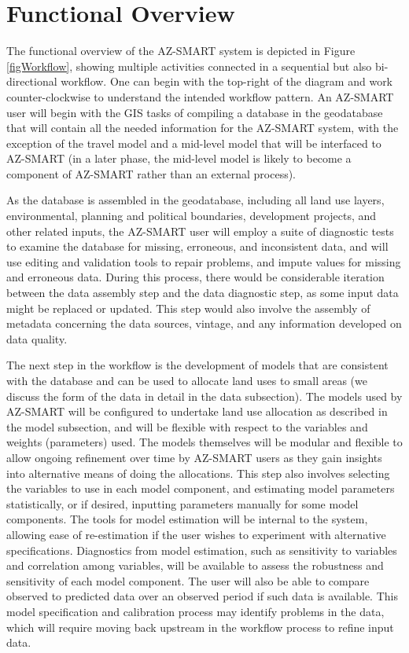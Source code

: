  \section{Functional Overview}
The functional overview of the AZ-SMART system is depicted in Figure
\ref{figWorkflow}, showing multiple activities connected in a
sequential but also bi-directional workflow.  One can begin with the
top-right of the diagram and work counter-clockwise to understand
the intended workflow pattern.  An AZ-SMART user will begin with the
GIS tasks of compiling a database in the geodatabase that will
contain all the needed information for the AZ-SMART system, with the
exception of the travel model and a mid-level model that will be
interfaced to AZ-SMART (in a later phase, the mid-level model is
likely to become a component of AZ-SMART rather than an external
process).

As the database is assembled in the geodatabase, including all land
use layers, environmental, planning and political boundaries,
development projects, and other related inputs, the AZ-SMART user
will employ a suite of diagnostic tests to examine the database for
missing, erroneous, and inconsistent data, and will use editing and
validation tools to repair problems, and impute values for missing
and erroneous data.  During this process, there would be
considerable iteration between the data assembly step and the data
diagnostic step, as some input data might be replaced or updated.
This step would also involve the assembly of metadata concerning the
data sources, vintage, and any information developed on data
quality.

The next step in the workflow is the development of models that are
consistent with the database and can be used to allocate land uses
to small areas (we discuss the form of the data in detail in the
data subsection).  The models used by AZ-SMART will be configured to
undertake land use allocation as described in the model subsection,
and will be flexible with respect to the variables and weights
(parameters) used.  The models themselves will be modular and
flexible to allow ongoing refinement over time by AZ-SMART users as
they gain insights into alternative means of doing the allocations.
This step also involves selecting the variables to use in each model
component, and estimating model parameters statistically, or if
desired, inputting parameters manually for some model components.
The tools for model estimation will be internal to the system,
allowing ease of re-estimation if the user wishes to experiment with
alternative specifications.  Diagnostics from model estimation, such
as sensitivity to variables and correlation among variables, will be
available to assess the robustness and sensitivity of each model
component.  The user will also be able to compare observed to
predicted data over an observed period if such data is available.
This model specification and calibration process may identify
problems in the data, which will require moving back upstream in the
workflow process to refine input data.

